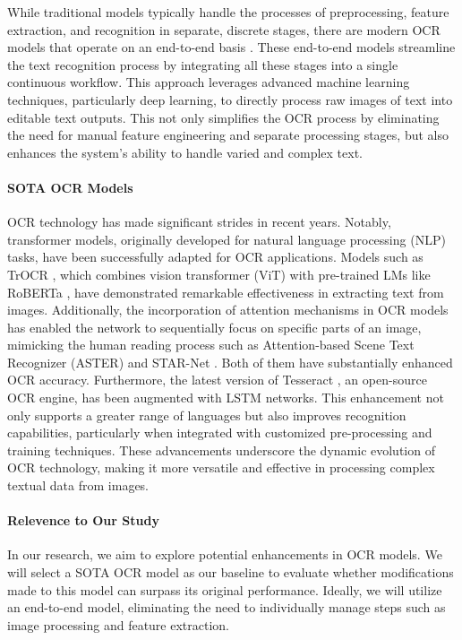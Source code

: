 
While traditional models typically handle the processes of preprocessing, feature extraction, and recognition in separate, discrete stages, there are modern OCR models that operate on an end-to-end basis \citep{huang2021multiplexed}\citep{neudecker2019ocr}\citep{belay2020amharic}. These end-to-end models streamline the text recognition process by integrating all these stages into a single continuous workflow. This approach leverages advanced machine learning techniques, particularly deep learning, to directly process raw images of text into editable text outputs. This not only simplifies the OCR process by eliminating the need for manual feature engineering and separate processing stages, but also enhances the system's ability to handle varied and complex text.

\paragraph*{SOTA OCR Models}
OCR technology has made significant strides in recent years. Notably, transformer models, originally developed for natural language processing (NLP) tasks, have been successfully adapted for OCR applications. Models such as TrOCR \citep{li2023trocr}, which combines vision transformer (ViT) \citep{dosovitskiy2021an}\citep{vaswani2017attention} with pre-trained LMs like RoBERTa \citep{liu2019roberta}, have demonstrated remarkable effectiveness in extracting text from images. Additionally, the incorporation of attention mechanisms in OCR models has enabled the network to sequentially focus on specific parts of an image, mimicking the human reading process such as Attention-based Scene Text Recognizer (ASTER) \citep{shi2018aster} and STAR-Net \citep{liu2016star}. Both of them have substantially enhanced OCR accuracy. Furthermore, the latest version of Tesseract \citep{smith2007overview}, an open-source OCR engine, has been augmented with LSTM \citep{hochreiter1997long} networks. This enhancement not only supports a greater range of languages but also improves recognition capabilities, particularly when integrated with customized pre-processing and training techniques. These advancements underscore the dynamic evolution of OCR technology, making it more versatile and effective in processing complex textual data from images.

\paragraph*{Relevence to Our Study}
In our research, we aim to explore potential enhancements in OCR models. We will select a SOTA OCR model as our baseline to evaluate whether modifications made to this model can surpass its original performance. Ideally, we will utilize an end-to-end model, eliminating the need to individually manage steps such as image processing and feature extraction.


